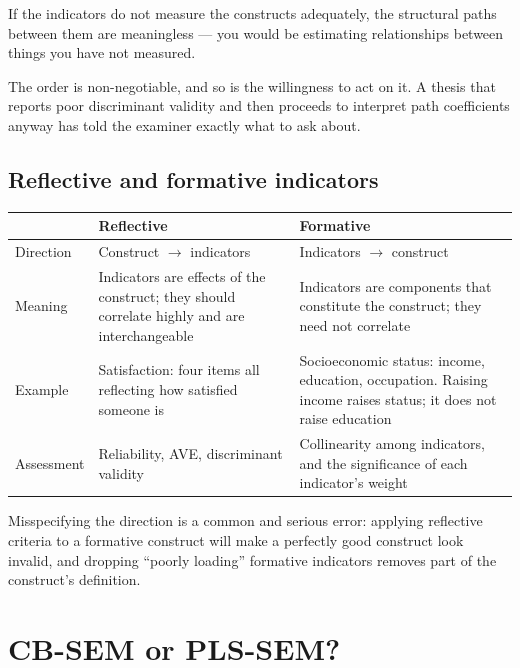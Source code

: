 \begin{alertbox}
If the indicators do not measure the constructs adequately, the structural
paths between them are meaningless --- you would be estimating relationships
between things you have not measured.

\medskip
The order is non-negotiable, and so is the willingness to act on it. A thesis
that reports poor discriminant validity and then proceeds to interpret path
coefficients anyway has told the examiner exactly what to ask about.
\end{alertbox}

\subsection{Reflective and formative indicators}

\begin{center}
\small
\begin{tabular}{@{}L{2.4cm}L{5.4cm}L{6.5cm}@{}}
\toprule
 & \textbf{Reflective} & \textbf{Formative} \\
\midrule
Direction  & Construct $\rightarrow$ indicators
           & Indicators $\rightarrow$ construct \\
Meaning    & Indicators are effects of the construct; they should correlate
             highly and are interchangeable
           & Indicators are components that constitute the construct; they need
             not correlate \\
Example    & Satisfaction: four items all reflecting how satisfied someone is
           & Socioeconomic status: income, education, occupation. Raising
             income raises status; it does not raise education \\
Assessment & Reliability, AVE, discriminant validity
           & Collinearity among indicators, and the significance of each
             indicator's weight \\
\bottomrule
\end{tabular}
\end{center}

Misspecifying the direction is a common and serious error: applying reflective
criteria to a formative construct will make a perfectly good construct look
invalid, and dropping ``poorly loading'' formative indicators removes part of
the construct's definition.

\section{CB-SEM or PLS-SEM?}

